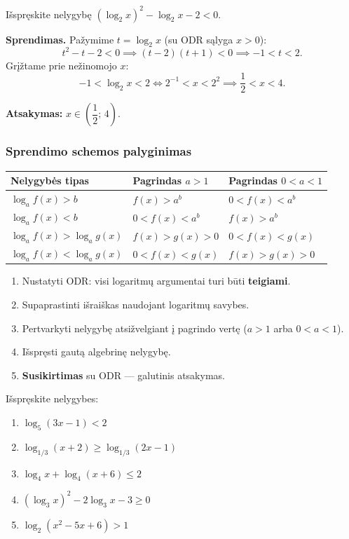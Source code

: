\begin{example}
Išspręskite nelygybę \((\log_2 x)^2 - \log_2 x - 2 < 0\).

\textbf{Sprendimas.} Pažymime \(t = \log_2 x\) (su ODR sąlyga \(x > 0\)):
\[
t^2 - t - 2 < 0 \implies (t-2)(t+1) < 0 \implies -1 < t < 2.
\]
Grįžtame prie nežinomojo \(x\):
\[
-1 < \log_2 x < 2 \iff 2^{-1} < x < 2^2 \implies \frac{1}{2} < x < 4.
\]

\textbf{Atsakymas:} \(x \in \left(\dfrac{1}{2};\, 4\right)\).
\end{example}

\subsubsection{Sprendimo schemos palyginimas}

\begin{center}
\begin{tabular}{|p{4.2cm}|p{4.8cm}|p{4.8cm}|}
\hline
\textbf{Nelygybės tipas} & \textbf{Pagrindas } \(a > 1\) & \textbf{Pagrindas } \(0 < a < 1\)\\
\hline
\(\log_a f(x) > b\) & \(f(x) > a^b\) & \(0 < f(x) < a^b\)\\
\hline
\(\log_a f(x) < b\) & \(0 < f(x) < a^b\) & \(f(x) > a^b\)\\
\hline
\(\log_a f(x) > \log_a g(x)\) & \(f(x) > g(x) > 0\) & \(0 < f(x) < g(x)\)\\
\hline
\(\log_a f(x) < \log_a g(x)\) & \(0 < f(x) < g(x)\) & \(f(x) > g(x) > 0\)\\
\hline
\end{tabular}
\end{center}

\begin{tcolorbox}[colback=blue!5, colframe=blue!40, title=\textbf{Logaritminių nelygybių sprendimo žingsniai}]
\begin{enumerate}
    \item Nustatyti ODR: visi logaritmų argumentai turi būti \textbf{teigiami}.
    \item Supaprastinti išraiškas naudojant logaritmų savybes.
    \item Pertvarkyti nelygybę atsižvelgiant į pagrindo vertę (\(a > 1\) arba \(0 < a < 1\)).
    \item Išspręsti gautą algebrinę nelygybę.
    \item \textbf{Susikirtimas} su ODR — galutinis atsakymas.
\end{enumerate}
\end{tcolorbox}

\begin{exercise}
Išspręskite nelygybes:
\begin{enumerate}[label=\alph*)]
    \item \(\log_5(3x - 1) < 2\)
    \item \(\log_{1/3}(x + 2) \geq \log_{1/3}(2x - 1)\)
    \item \(\log_4 x + \log_4(x + 6) \leq 2\)
    \item \((\log_3 x)^2 - 2\log_3 x - 3 \geq 0\)
    \item \(\log_2(x^2 - 5x + 6) > 1\)
\end{enumerate}
\end{exercise}

